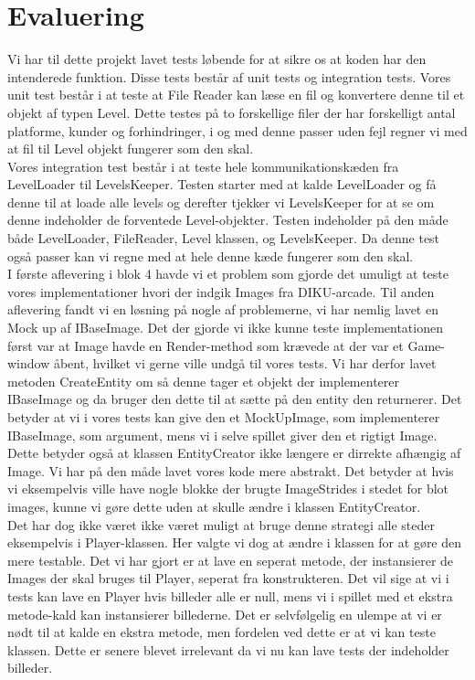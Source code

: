 \section{Evaluering}
   Vi har til dette projekt lavet tests løbende for at sikre os at koden har den intenderede funktion. Disse tests består af unit tests og integration tests. Vores unit test består i at teste at File Reader kan læse en fil og konvertere denne til et objekt af typen Level. Dette testes på to forskellige filer der har forskelligt antal platforme, kunder og forhindringer, i og med denne passer uden fejl regner vi med at fil til Level objekt fungerer som den skal.\\
   Vores integration test består i at teste hele kommunikationskæden fra LevelLoader til LevelsKeeper. Testen starter med at kalde LevelLoader og få denne til at loade alle levels og derefter tjekker vi LevelsKeeper for at se om denne indeholder de forventede Level-objekter. Testen indeholder på den måde både LevelLoader, FileReader, Level klassen, og LevelsKeeper. Da denne test også passer kan vi regne med at hele denne kæde fungerer som den skal.\\
   I første aflevering i blok 4 havde vi et problem som gjorde det umuligt at teste vores implementationer hvori der indgik Images fra DIKU-arcade. Til anden aflevering fandt vi en løsning på nogle af problemerne, vi har nemlig lavet en Mock up af IBaseImage. Det der gjorde vi ikke kunne teste implementationen først var at Image havde en Render-method som krævede at der var et Game-window åbent, hvilket vi gerne ville undgå til vores tests. Vi har derfor lavet metoden CreateEntity om så denne tager et objekt der implementerer IBaseImage og da bruger den dette til at sætte på den entity den returnerer. Det betyder at vi i vores tests kan give den et MockUpImage, som implementerer IBaseImage, som argument, mens vi i selve spillet giver den et rigtigt Image. Dette betyder også at klassen EntityCreator ikke længere er dirrekte afhængig af Image. Vi har på den måde lavet vores kode mere abstrakt. Det betyder at hvis vi eksempelvis ville have nogle blokke der brugte ImageStrides i stedet for blot images, kunne vi gøre dette uden at skulle ændre i klassen EntityCreator.\\
   Det har dog ikke været ikke været muligt at bruge denne strategi alle steder eksempelvis i Player-klassen. Her valgte vi dog at ændre i klassen for at gøre den mere testable. Det vi har gjort er at lave en seperat metode, der instansierer de Images der skal bruges til Player, seperat fra konstrukteren. Det vil sige at vi i tests kan lave en Player hvis billeder alle er null, mens vi i spillet med et ekstra metode-kald kan instansierer billederne. Det er selvfølgelig en ulempe at vi er nødt til at kalde en ekstra metode, men fordelen ved dette er at vi kan teste klassen. Dette er senere blevet irrelevant da vi nu kan lave tests der indeholder billeder.  


